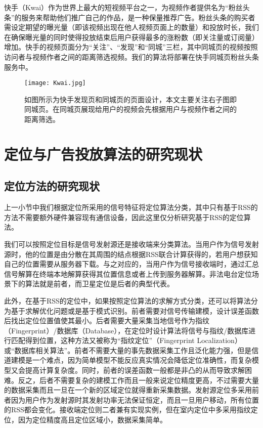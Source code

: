 快手（Kwai）作为世界上最大的短视频平台之一，为视频作者提供名为“粉丝头条”的服务来帮助他们推广自己的作品，是一种保量推荐广告。粉丝头条的购买者需设定期望的曝光量（即该视频出现在他人视频页面上的数量）和投放时长，我们在确保曝光量的同时使得投放结束后用户获得最多的涨粉数（即关注量或订阅量）增加。快手的视频页面分为“关注”、“发现”和“同城”三栏，其中同城页的视频按照访问者与视频作者之间的距离筛选视频。我们的算法将部署在快手同城页粉丝头条服务中。

\begin{figure}
	\centering
	\texttt{[image: Kwai.jpg]}
	\caption{如图所示为快手发现页和同城页的页面设计，本文主要关注右子图即同城页。在同城页展现给用户的视频会先根据用户与视频作者之间的距离筛选。}
	\label{fig:kwai}
\end{figure}

\section{定位与广告投放算法的研究现状}
\label{sec:first}

\subsection{定位方法的研究现状}

上一小节中我们根据定位所采用的信号特征将定位算法分类，其中只有基于RSS的方法不需要额外硬件兼容现有通信设备，因此这里仅分析研究基于RSS的定位算法。

我们可以按照定位目标是信号发射源还是接收端来分类算法。当用户作为信号发射源时，他的位置是由分散在其周围的结点根据RSS联合计算获得的，若用户想获知自己的位置需要从服务器下载。与之对应的，当用户作为信号接收端时，通过汇总信号解算在终端本地解算获得其位置信息或者上传到服务器解算。非法电台定位场景下的算法就是前者，而卫星定位是后者的典型代表。

此外，在基于RSS的定位中，如果按照定位算法的求解方式分类，还可以将算法分为基于求解优化问题或是基于模式识别。前者需要对信号传输建模，设计误差函数后找出定位位置值使其最小。后者需要大量采集当地信号作为指纹（Fingerprint）/数据库（Database），在定位时设计算法将信号与指纹/数据库进行匹配得到位置，这种方法又被称为“指纹定位”（Fingerprint Localization）或“数据库相关算法”。前者不需要大量的事先数据采集工作且泛化能力强，但是信道建模是一个难点，因为简单模型不能反应真实情况会降低定位准确性，而复杂模型又会提高计算复杂度。同时，前者的误差函数一般都是非凸的从而导致求解困难。反之，后者不需要复杂的建模工作而且一般来说定位精度更高，不过需要大量的数据采集而且一旦在一个新的区域定位就得重新采集数据。发射源定位多采用前者因为用户作为发射源时其发射功率无法保证恒定，而且一旦用户移动，所有位置的RSS都会变化。接收端定位则二者兼有实现实例，但在室内定位中多采用指纹定位，因为定位精度高且定位区域小，数据采集简单。

